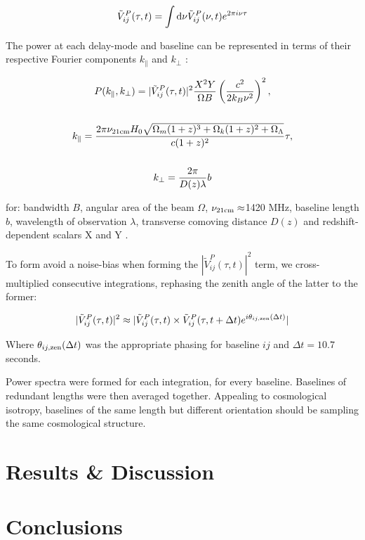 \begin{equation}
\tilde{V}_{ij}^{P}(\tau, t) = \int {\rm d}\nu \tilde{V}_{ij}^{P}(\nu, t)e^{2\pi i \nu \tau}
\end{equation}

The power at each delay-mode and baseline can be represented in terms of their respective Fourier components $k_{\parallel}$ and $k_{\perp}$ \citep{Parsons.12a, Nithya.15b}:

\begin{multline}
P(k_{\parallel},k_{\perp}) = | \tilde{V}_{ij}^{P}(\tau, t) |^2 \frac{X^2 Y}{\Omega B} \left(\frac{c^2}{2k_B\nu^2}\right)^2 , \\\\
k_{\parallel} = \frac{2\pi \nu_{\rm 21cm} H_0 \sqrt{\Omega_m (1+z)^3 + \Omega_k (1+z)^2 + \Omega_{\Lambda}} }{c (1+z)^2}\tau, \\\\
k_{\perp} = \frac{2\pi}{D(z) \lambda} b\\
\end{multline}

for: bandwidth $B$, angular area of the beam $\Omega$, $\nu_{\rm 21cm}\approx$1420 MHz, baseline length $b$, wavelength of observation $\lambda$, transverse comoving distance $D(z)$ and redshift-dependent scalars X and Y \citep{Parsons.12b}.

To form avoid a noise-bias when forming the $ |\tilde{V}_{ij}^{P}(\tau, t) |^2$ term, we cross-multiplied consecutive integrations, rephasing the zenith angle of the latter to the former:

\begin{equation}
 | \tilde{V}_{ij}^{P}(\tau, t) |^2 \approx | \tilde{V}_{ij}^{P}(\tau, t) \times \tilde{V}_{ij}^{P}(\tau, t+\Delta t)e^{i\theta_{ij,\rm zen}(\Delta t)}|
\end{equation}

Where $\theta_{ij,\rm zen}(\Delta t)$ was the appropriate phasing for baseline $ij$ and $\Delta t = 10.7$ seconds. 

Power spectra were formed for each integration, for every baseline. Baselines of redundant lengths were then averaged together. Appealing to cosmological isotropy, baselines of the same length but different orientation should be sampling the same cosmological structure. 

\section{Results \& Discussion}
\label{sec:hera19_results}


\section{Conclusions}
\label{sec:hera19_conc}
